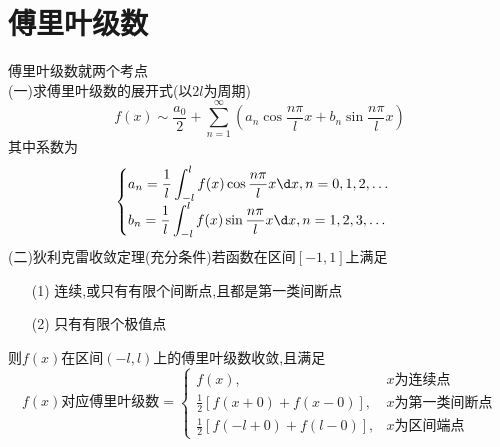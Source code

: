 \documentclass[12pt, a4paper, oneside, UTF8]{ctexbook}
\begin{document}
\section{傅里叶级数}
\begin{remark}
    傅里叶级数就两个考点 \\
    (一)求傅里叶级数的展开式(以$2l$为周期)
    $$
    f(x)\sim\frac{a_0}{2}+\sum_{n=1}^{\infty}\left(a_n\cos\frac{n\pi}{l}x+b_n\sin\frac{n\pi}{l}x\right)
    $$
    其中系数为
    $$
    \begin{cases}
        \displaystyle a_n = \frac{1}{l}\int_{-l}^{l}f(x)\cos\frac{n\pi}{l}x\d x, n = 0, 1, 2, \ldots \\
        \displaystyle b_n = \frac{1}{l}\int_{-l}^{l}f(x)\sin\frac{n\pi}{l}x\d x, n = 1, 2, 3, \ldots \\
    \end{cases}
    $$
    (二)狄利克雷收敛定理(充分条件)若函数在区间$[-1,1]$上满足 
    \begin{enumerate}
        \item [(1)] 连续,或只有有限个间断点,且都是第一类间断点 
        \item [(2)] 只有有限个极值点
    \end{enumerate}
    则$f(x)$在区间$(-l,l)$上的傅里叶级数收敛,且满足 
    $$
    f(x)\text{对应傅里叶级数}=
    \begin{cases}
        f(x), &x\text{为连续点} \\
        \frac{1}{2}\left[f(x+0)+f(x-0)\right], &x\text{为第一类间断点} \\
        \frac{1}{2}\left[f(-l+0)+f(l-0)\right], &x\text{为区间端点}
    \end{cases}
    $$
\end{remark}
\end{document}
